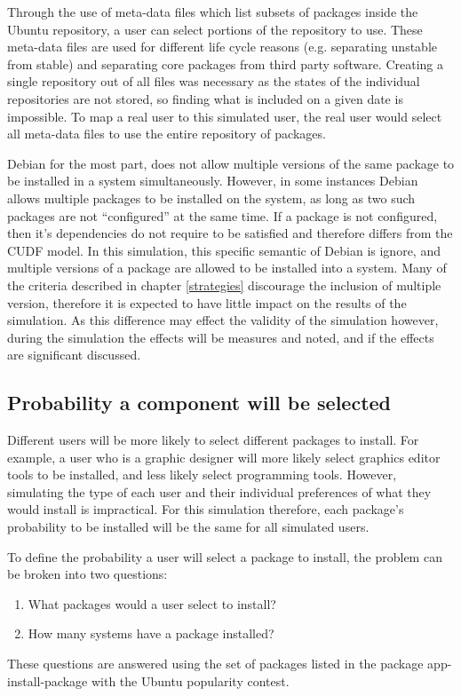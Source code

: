 Through the use of meta-data files which list subsets of packages inside the Ubuntu repository, a user can select portions of the repository to use.
These meta-data files are used for different life cycle reasons (e.g. separating unstable from stable) and separating core packages from third party software.
Creating a single repository out of all files was necessary as the states of the individual repositories are not stored,
so finding what is included on a given date is impossible.
To map a real user to this simulated user, the real user would select all meta-data files to use the entire repository of packages. 

Debian for the most part, does not allow multiple versions of the same package to be installed in a system simultaneously.
However, in some instances Debian allows multiple packages to be installed on the system, as long as two such packages are not ``configured'' at the same time.
If a package is not configured, then it's dependencies do not require to be satisfied and therefore differs from the CUDF model.
In this simulation, this specific semantic of Debian is ignore, and multiple versions of a package are allowed to be installed into a system.
Many of the criteria described in chapter \ref{strategies} discourage the inclusion of multiple version,
therefore it is expected to have little impact on the results of the simulation.
As this difference may effect the validity of the simulation however, during the simulation the effects will be measures and noted, and if the effects are significant discussed.


\subsection{Probability a component will be selected}
Different users will be more likely to select different packages to install.
For example, a user who is a graphic designer will more likely select graphics editor tools to be installed, and less likely select programming tools.
However, simulating the type of each user and their individual preferences of what they would install is impractical.
For this simulation therefore, each package's probability to be installed will be the same for all simulated users.

To define the probability a user will select a package to install, the problem can be broken into two questions:
\begin{enumerate}
  \item What packages would a user select to install?
  \item How many systems have a package installed?
\end{enumerate}
These questions are answered using the set of packages listed in the package app-install-package with the Ubuntu popularity contest.

